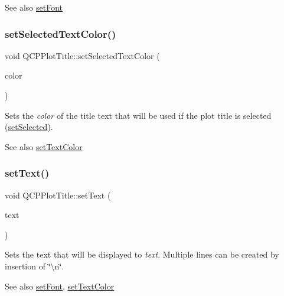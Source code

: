 \begin{DoxySeeAlso}{See also}
\hyperlink{class_q_c_p_plot_title_a199fc7170802ea65006c371875349e37}{set\+Font} 
\end{DoxySeeAlso}
\hypertarget{class_q_c_p_plot_title_a09ffd8c52ac8824d00382f84be391b66}{}\label{class_q_c_p_plot_title_a09ffd8c52ac8824d00382f84be391b66} 
\subsubsection{\texorpdfstring{set\+Selected\+Text\+Color()}{setSelectedTextColor()}}
{\footnotesize\ttfamily void Q\+C\+P\+Plot\+Title\+::set\+Selected\+Text\+Color (\begin{DoxyParamCaption}\item[{const Q\+Color \&}]{color }\end{DoxyParamCaption})}

Sets the {\itshape color} of the title text that will be used if the plot title is selected (\hyperlink{class_q_c_p_plot_title_a8d441a889d371307df86f1ab7687a333}{set\+Selected}).

\begin{DoxySeeAlso}{See also}
\hyperlink{class_q_c_p_plot_title_a71273e3a0ca6b4c151591b37b9e5ce33}{set\+Text\+Color} 
\end{DoxySeeAlso}
\hypertarget{class_q_c_p_plot_title_aae5a93e88050dfb2cbf6adc087516821}{}\label{class_q_c_p_plot_title_aae5a93e88050dfb2cbf6adc087516821} 
\subsubsection{\texorpdfstring{set\+Text()}{setText()}}
{\footnotesize\ttfamily void Q\+C\+P\+Plot\+Title\+::set\+Text (\begin{DoxyParamCaption}\item[{const Q\+String \&}]{text }\end{DoxyParamCaption})}

Sets the text that will be displayed to {\itshape text}. Multiple lines can be created by insertion of \char`\"{}\textbackslash{}n\char`\"{}.

\begin{DoxySeeAlso}{See also}
\hyperlink{class_q_c_p_plot_title_a199fc7170802ea65006c371875349e37}{set\+Font}, \hyperlink{class_q_c_p_plot_title_a71273e3a0ca6b4c151591b37b9e5ce33}{set\+Text\+Color} 
\end{DoxySeeAlso}
\hypertarget{class_q_c_p_plot_title_a71273e3a0ca6b4c151591b37b9e5ce33}{}\label{class_q_c_p_plot_title_a71273e3a0ca6b4c151591b37b9e5ce33} 
